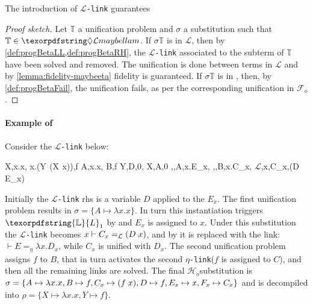 \documentclass[sigconf,natbib=false,review]{acmart}
\newcommand{\appsep}{\ensuremath{\textcolor{lightgray}{\cdot}}}
\newcommand{\llambda}{\ensuremath{\mathcal{L}}\xspace}
\newcommand{\linkMacro}[1]{\ensuremath{#1}\texttt{-link}\xspace}
\newcommand{\linkbeta}{\linkMacro{\llambda}}
\newcommand{\linketa} {\linkMacro{\eta}}
\newcommand{\Fo}{\texorpdfstring{\ensuremath{\mathcal{F}_{\!o}\xspace}}{Fo}} %
\newcommand{\Ho}{\texorpdfstring{\ensuremath{\mathcal{H}_o}\xspace}{Ho}}
\newcommand{\linketaM}[3]{\ensuremath{#1 \vdash #2 =_\eta #3}}
\newcommand{\linkbetaM}[3]{\ensuremath{#1 \vdash #2 =_{\llambda} #3}}
\newcommand{\rhs}{rhs\xspace}
\newcommand{\linkStore}{\texorpdfstring{\ensuremath{\mathbb{L}}\xspace}{L}}
\newcommand{\hoUnifPb}{\ensuremath{\mathbb{T}}\xspace}
\begin{document}

\begin{theorem}[Fidelity with \linkbeta]
  The introduction of \linkbeta guarantees 
\end{theorem}

\begin{proof}[Proof sketch]
  Let \hoUnifPb a unification problem and $\sigma$ a substitution
  such that $\hoUnifPb \in \notllambda$. 
  If $\sigma\hoUnifPb$ is in \llambda, then by
  \cref{def:progBetaLL,def:progBetaRH}, the \linkbeta associated to the subterm of
  \hoUnifPb have been solved and removed. The
  unification is done between terms in \llambda and by \cref{lemma:fidelity-maybeeta}
  fidelity is guaranteed. If $\sigma\hoUnifPb$ is in \notllambda,
  then, by \cref{def:progBetaFail}, the unification fails, as per the
  corresponding unification in \Fo{}.
\end{proof}

\paragraph{Example of \progBetaLL}
Consider the \linkbeta below:

\printAlll
  {{{X,\lambda x.x},
    {\lambda x.(Y\appsep (X\appsep x)),f}}}
  {{{A,\lambda x.x},
    {B,f}}}
  {{{Y,D,0},
    {X,A,0}}}
  {{{\eta,,A,\lambda x.E_{x}},
    {\eta,,B,\lambda x.C_{x}},
    {\llambda,x,C_{x},(D\appsep E_{x})}}}

\noindent
Initially the \linkbeta \rhs is a variable $D$ applied to the $E_x$.
The first unification problem results in $\sigma =
\{A \mapsto \lambda x.x\}$. In turn this instantiation
triggers $\linkStore_1$ by \progressetaleft 
and $E_x$ is assigned to $x$.
Under this substitution the \linkbeta becomes
\linkbetaM{x}{C_x}{(D \appsep x)}, and by \progBetaLL
it is replaced with the link:
\linketaM{}{E}{\lambda x.D_x}, while $C_x$ is unified with $D_x$. The second unification
problem assigns $f$ to $B$, that in turn activates
the second \linketa ($f$ is assigned to $C$), and then all the remaining links
are solved. The final \Ho substitution is $\sigma = \{A _{} \mapsto \lambda x.x, 
B _{} \mapsto f, C _{x} \mapsto (f\appsep x), 
D _{} \mapsto f, E _{x} \mapsto x, F _{x} \mapsto C_{x} \}$ and is decompiled into $\rho = \{X \mapsto \lambda x.x,
Y \mapsto f\}$.
\end{document}
